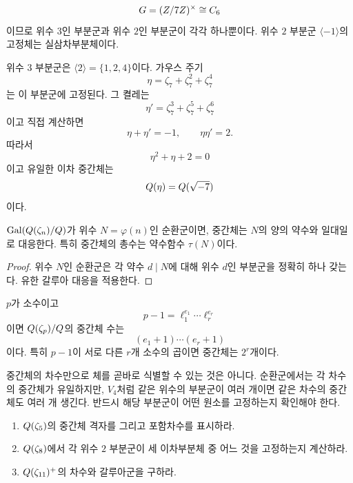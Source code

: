 \begin{example}
\[
  G=(Z/7Z)^\times\cong C_6
\]
이므로 위수 $3$인 부분군과 위수 $2$인 부분군이 각각 하나뿐이다. 위수 $2$ 부분군 $\langle-1\rangle$의 고정체는 실삼차부분체이다.

위수 $3$ 부분군은 $\langle2\rangle=\{1,2,4\}$이다. 가우스 주기
\[
  \eta=\zeta_7+\zeta_7^2+\zeta_7^4
\]
는 이 부분군에 고정된다. 그 켤레는
\[
  \eta'=\zeta_7^3+\zeta_7^5+\zeta_7^6
\]
이고 직접 계산하면
\[
  \eta+\eta'=-1,
  \qquad
  \eta\eta'=2.
\]
따라서
\[
  \eta^2+\eta+2=0
\]
이고 유일한 이차 중간체는
\[
  Q(\eta)=Q(\sqrt{-7})
\]
이다.
\end{example}

\begin{proposition}
\label{prop:cyclic-cyclotomic-subfield-count}
$\operatorname{Gal}(Q(\zeta_n)/Q)$가 위수 $N=\varphi(n)$인 순환군이면, 중간체는 $N$의 양의 약수와 일대일로 대응한다. 특히 중간체의 총수는 약수함수 $\tau(N)$이다.
\end{proposition}

\begin{proof}
위수 $N$인 순환군은 각 약수 $d\mid N$에 대해 위수 $d$인 부분군을 정확히 하나 갖는다. 유한 갈루아 대응을 적용한다.
\end{proof}

\begin{corollary}
$p$가 소수이고
\[
  p-1=\ell_1^{e_1}\cdots\ell_r^{e_r}
\]
이면 $Q(\zeta_p)/Q$의 중간체 수는
\[
  (e_1+1)\cdots(e_r+1)
\]
이다. 특히 $p-1$이 서로 다른 $r$개 소수의 곱이면 중간체는 $2^r$개이다.
\end{corollary}

\begin{pitfall}
중간체의 차수만으로 체를 곧바로 식별할 수 있는 것은 아니다. 순환군에서는 각 차수의 중간체가 유일하지만, $V_4$처럼 같은 위수의 부분군이 여러 개이면 같은 차수의 중간체도 여러 개 생긴다. 반드시 해당 부분군이 어떤 원소를 고정하는지 확인해야 한다.
\end{pitfall}

\begin{checkpoint}
\begin{enumerate}[label=(\alph*)]
  \item $Q(\zeta_5)$의 중간체 격자를 그리고 포함차수를 표시하라.
  \item $Q(\zeta_8)$에서 각 위수 $2$ 부분군이 세 이차부분체 중 어느 것을 고정하는지 계산하라.
  \item $Q(\zeta_{11})^+$의 차수와 갈루아군을 구하라.
\end{enumerate}
\end{checkpoint}
